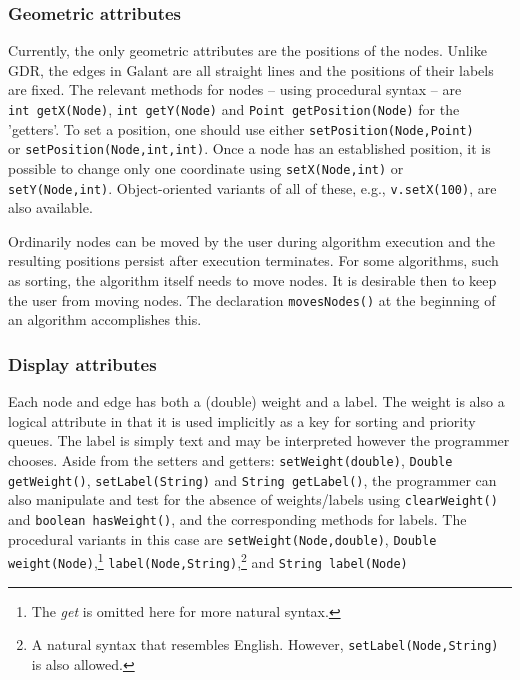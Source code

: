 \subsubsection*{Geometric attributes}

Currently, the only geometric attributes are the positions of the
nodes. 
Unlike GDR, the edges in Galant
are all straight lines and the positions of their labels are fixed.
The relevant methods for nodes -- using procedural syntax -- are
\texttt{int~getX(Node)}, \texttt{int~getY(Node)}
and \texttt{Point~getPosition(Node)}
for the 'getters'. To set a position,
one should use either
\texttt{setPosition(Node,Point)}\\
or \texttt{setPosition(Node,int,int)}.
Once a node has an established position, it is possible to change
only one coordinate using \texttt{setX(Node,int)} or \texttt{setY(Node,int)}.
Object-oriented variants of all of these, e.g.,
\texttt{v.setX(100)}, are also available.

Ordinarily nodes can be moved by the user during algorithm execution
and the resulting positions persist after execution terminates.
For some algorithms, such as sorting, the algorithm itself needs to move
nodes.
It is desirable then to keep the user from moving nodes.
The declaration \texttt{movesNodes()} at the beginning of an algorithm
accomplishes this.

\subsubsection*{Display attributes}

Each node and edge has
both a (double) weight and a label.
The weight
is also a logical
attribute in that
it is used implicitly as a
key for
sorting and priority queues.
The label is simply text and may be interpreted however the programmer
chooses.
Aside from the setters and getters: \texttt{setWeight(double)},
\mbox{\texttt{Double getWeight()}}, \texttt{setLabel(String)}
and \mbox{\texttt{String getLabel()}}, the programmer can also
manipulate and test for the absence of weights/labels using
\texttt{clearWeight()} and \texttt{boolean~hasWeight()},
and the corresponding methods for labels.
The procedural variants in this case are
\texttt{setWeight(Node,double)},
\mbox{\texttt{Double weight(Node)}},\footnote{
  The \emph{get} is omitted here for more natural syntax.}
\texttt{label(Node,String)},\footnote{
  A natural syntax that resembles English. However,
  \texttt{setLabel(Node,String)} is also allowed.
}
and \mbox{\texttt{String label(Node)}}


